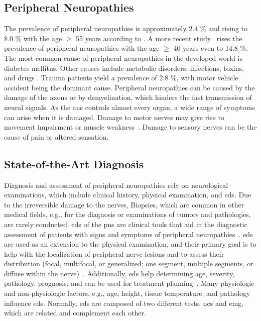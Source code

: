 \subsection{Peripheral Neuropathies}
The prevalence of peripheral neuropathies is approximately 2.4 \% and rising to 8.0 \% with the age $\geq$ 55 years according to \cite{Martyn1997EpidemiologyNeuropathy}. A more recent study~\cite{Gregg2004PrevalenceSurvey} rises the prevalence of peripheral neuropathies with the age $\geq$ 40 years even to 14.8 \%. The most common cause of peripheral neuropathies in the developed world is diabetes mellitus. Other causes include metabolic disorders, infections, toxins, and drugs \cite{England2004PeripheralNeuropathy,Hughes466}. Trauma patients yield a prevalence of 2.8 \%, with motor vehicle accident being the dominant cause. Peripheral neuropathies can be caused by the damage of the axons or by demyelination, which hinders the fast transmission of neural signals. 
As the \gls{ans} controls almost every organ, a wide range of symptoms can arise when it is damaged. Damage to motor nerves may give rise to movement impairment or muscle weakness~\cite{Mohassel2015}. Damage to sensory nerves can be the cause of pain or altered sensation.

\subsection{State-of-the-Art Diagnosis}
Diagnosis and assessment of peripheral neuropathies rely on neurological examinations, which include clinical history, physical examination, and \gls{eds}. Due to the irreversible damage to the nerves, Biopsies, which are common in other medical fields, e.g., for the diagnosis or examinations of tumors and pathologies, are rarely conducted. \gls{eds} of the \gls{pns} are clinical tools that aid in the diagnostic assessment of patients with signs and symptoms of peripheral neuropathies~\cite{Mohassel2015}. \gls{eds} are used as an extension to the physical examination, and their primary goal is to help with the localization of peripheral nerve lesions and to assess their distribution (focal, multifocal, or generalized; one segment, multiple segments, or diffuse within the nerve)~\cite{Mohassel2015}. Additionally, \gls{eds} help determining age, severity, pathology, prognosis, and can be used for treatment planning~\cite{Mohassel2015}. Many physiologic and non-physiologic factors, e.g., age, height, tissue temperature, and pathology influence \gls{eds}. Normally, \gls{eds} are composed of two different tests, \gls{ncs} and \gls{emg}, which are related and complement each other.\\

